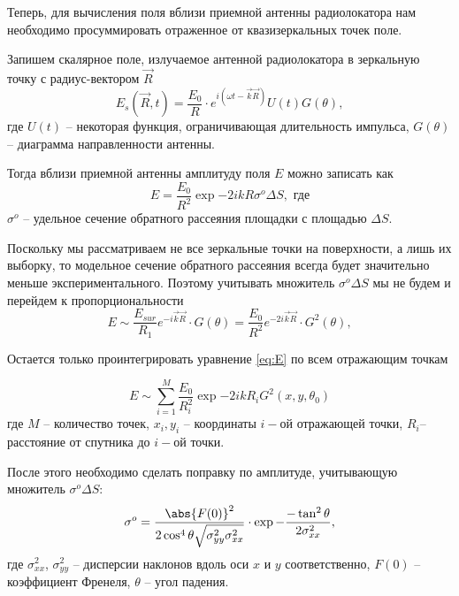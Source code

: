 Теперь, для вычисления поля вблизи приемной антенны радиолокатора нам
необходимо просуммировать отраженное от квазизеркальных точек поле.


Запишем скалярное поле, излучаемое антенной радиолокатора в зеркальную точку с радиус-вектором $\vec
R$
\begin{equation}
    \label{eq:}
    E_{s}(\vec R,t) = \frac{E_0}{R}  \cdot  e^{i(\omega t - \vec k \vec
    R)} U(t)G(\theta), 
\end{equation}
где $U(t)$ -- некоторая функция, ограничивающая длительность импульса,
$G(\theta)$ -- диаграмма направленности антенны.



Тогда вблизи приемной антенны амплитуду поля $E$ можно записать как
\begin{equation}
    \label{eq:}
    E =  \frac{E_0}{R^2} \exp{-2ikR} \sigma^o \Delta S, \text{ где}
\end{equation}
$\sigma^o$ -- удельное сечение обратного рассеяния площадки с площадью  $\Delta
S$.

Поскольку мы рассматриваем не все зеркальные точки на поверхности, а лишь их
выборку, то модельное сечение обратного рассеяния всегда будет значительно
меньше экспериментального. Поэтому учитывать множитель $\sigma^o \Delta S$ мы
не будем и перейдем к пропорциональности
\begin{equation}
    \label{eq:E}
    E \sim \frac{E_{sur}}{R_1} e^{-i\vec k \vec R} \cdot G(\theta) =
    \frac{E_0}{R^2} e^{-2i\vec k \vec R} \cdot G^2(\theta), 
\end{equation}


Остается только проинтегрировать уравнение \eqref{eq:E} по всем отражающим
точкам 



\begin{equation}
    \label{eq:}
    E \sim \sum\limits_{i=1}^{M} \frac{E_0}{R_i^2} \exp{-2ikR_i}
    G^2(x,y,\theta_0)
\end{equation}
где $M$ -- количество точек,  $x_i,y_i$ -- координаты  $i-$ой отражающей точки,
 $R_i$-- расстояние от спутника до  $i-$ой точки.

 После этого необходимо сделать поправку по амплитуде, учитывающую множитель
 $\sigma^o \Delta S$:
 \begin{equation}
     \label{eq:frenel}
     \sigma^o = \frac{\abs{F(0)}^2}{2\cos^4\theta \sqrt{\sigma^2_{yy}\sigma^2_{xx}}}
     \cdot \exp{-\frac{-\tan^2 \theta}{2 \sigma^2_{xx}}},
 \end{equation}
 где $\sigma_{xx}^2$, $\sigma_{yy}^2$ -- дисперсии наклонов вдоль оси $x$ и $y$
 соответственно, $F(0)$ -- коэффициент Френеля,  $\theta$ -- угол падения. 

